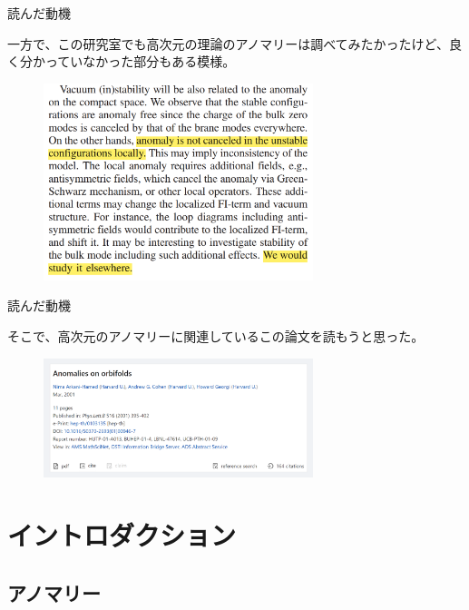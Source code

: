 \documentclass[
  unicode,a4paper,10pt,
  xcolor = {dvipsnames,svgnames},
  hyperref ={colorlinks=true,citecolor=Navy,linkcolor=NavyBlue,urlcolor=purple},
  ja=standard,lualatex
]{beamer}
\begin{document}
\begin{frame}{読んだ動機}

  一方で、この研究室でも高次元の理論のアノマリーは調べてみたかったけど、良く分かっていなかった部分もある模様。
  \begin{figure}[ht]
    \centering
    \includegraphics[width=0.7\textwidth]{fig/Abe2020vmv.png}
    \cite{Abe:2020vmv}    
  \end{figure}

\end{frame}


\begin{frame}{読んだ動機}

  そこで、高次元のアノマリーに関連しているこの論文を読もうと思った。
  \begin{figure}[ht]
    \centering
    \includegraphics[width=0.7\textwidth]{fig/Arkani-Hamed2001uol.png}
  \end{figure}

\end{frame}


\section{イントロダクション}

\begin{frame}[plain]
  \huge \secname
\end{frame}

\subsection{アノマリー}
\end{document}

